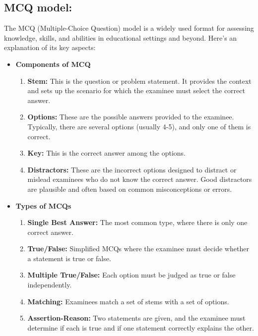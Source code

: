 \subsection{MCQ model:} \label{mcq_model}
The MCQ (Multiple-Choice Question) model is a widely used format for assessing knowledge, skills, and abilities in educational settings and beyond. Here’s an explanation of its key aspects:
\begin{itemize}
\item \textbf{Components of MCQ}
\begin{enumerate}
\item \textbf{Stem:} This is the question or problem statement. It provides the context and sets up the scenario for which the examinee must select the correct answer.
\item \textbf{Options:} These are the possible answers provided to the examinee. Typically, there are several options (usually 4-5), and only one of them is correct.
\item \textbf{Key:} This is the correct answer among the options.
\item \textbf{Distractors:} These are the incorrect options designed to distract or mislead examinees who do not know the correct answer. Good distractors are plausible and often based on common misconceptions or errors.
\end{enumerate}
\item \textbf{Types of MCQs}
\begin{enumerate}
\item \textbf{Single Best Answer:} The most common type, where there is only one correct answer.
\item \textbf{True/False:} Simplified MCQs where the examinee must decide whether a statement is true or false.
\item \textbf{Multiple True/False:} Each option must be judged as true or false independently.
\item \textbf{Matching:} Examinees match a set of stems with a set of options.
\item \textbf{Assertion-Reason:} Two statements are given, and the examinee must determine if each is true and if one statement correctly explains the other.
\end{enumerate}
\end{itemize}

